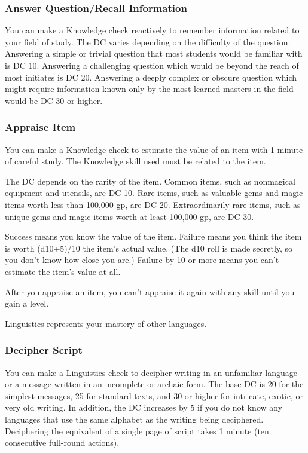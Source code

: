 \subsubsection{Answer Question/Recall Information}
You can make a Knowledge check reactively to remember information related to your field of study. The DC varies depending on the difficulty of the question. Answering a simple or trivial question that most students would be familiar with is DC 10. Answering a challenging question which would be beyond the reach of most initiates is DC 20. Answering a deeply complex or obscure question which might require information known only by the most learned masters in the field would be DC 30 or higher.

\subsubsection{Appraise Item}
You can make a Knowledge check to estimate the value of an item with 1 minute of careful study. The Knowledge skill used must be related to the item.

The DC depends on the rarity of the item. Common items, such as nonmagical equipment and utensils, are DC 10. Rare items, such as valuable gems and magic items worth less than 100,000 gp, are DC 20. Extraordinarily rare items, such as unique gems and magic items worth at least 100,000 gp, are DC 30.

Success means you know the value of the item. Failure means you think the item is worth (d10+5)/10 \mtimes the item's actual value. (The d10 roll is made secretly, so you don't know how close you are.) Failure by 10 or more means you can't estimate the item's value at all.

After you appraise an item, you can't appraise it again with any skill until you gain a level.

Linguistics represents your mastery of other languages.

\subsubsection{Decipher Script}
You can make a Linguistics check to decipher writing in an unfamiliar language or a message written in an incomplete or archaic form. The base DC is 20 for the simplest messages, 25 for standard texts, and 30 or higher for intricate, exotic, or very old writing. In addition, the DC increases by 5 if you do not know any languages that use the same alphabet as the writing being deciphered. Deciphering the equivalent of a single page of script takes 1 minute (ten consecutive full-round actions).

